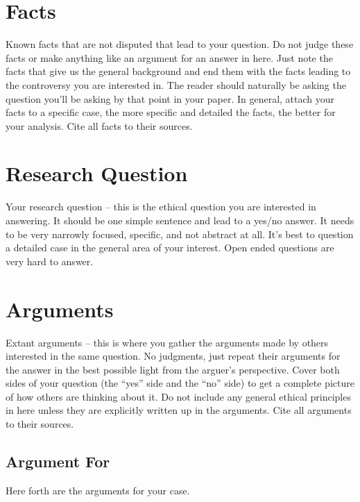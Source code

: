 \documentclass[12pt]{article}
\begin{document}
\begin{multicols}{2}

\setcounter{page}{1}


\section{Facts}

Known facts that are not disputed that lead to your question. Do not judge these facts or make anything like an argument for an answer in here. Just note the facts that give us the general background and end them with the facts leading to the controversy you are interested in. The reader should naturally be asking the question you'll be asking by that point in your paper. In general, attach your facts to a specific case, the more specific and detailed the facts, the better for your analysis. Cite all facts to their sources. %

\section{Research Question}

Your research question -- this is the ethical question you are interested in answering. It should be one simple sentence and lead to a yes/no answer. It needs to be very narrowly focused, specific, and not abstract at all. It's best to question a detailed case in the general area of your interest. Open ended questions are very hard to answer. \cite{handout}

\section{Arguments}

Extant arguments -- this is where you gather the arguments made by others interested in the same question. No judgments, just repeat their arguments for the answer in the best possible light from the arguer's perspective. Cover both sides of your question (the ``yes'' side and the ``no'' side) to get a complete picture of how others are thinking about it. Do not include any general ethical principles in here unless they are explicitly written up in the arguments. Cite all arguments to their sources. \cite{handout}

\subsection{Argument For}
Here forth are the arguments for your case.

\end{multicols}
\end{document}
